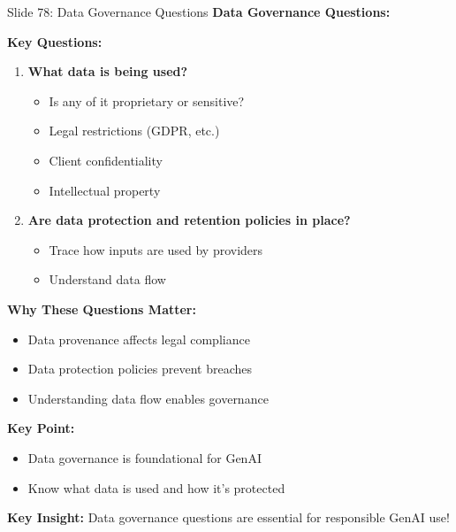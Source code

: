 \documentclass[8pt]{beamer}
\begin{document}
	\begin{frame}{Slide 78: Data Governance Questions}
		\fontsize{6.5}{7.5}\selectfont
		\textbf{Data Governance Questions:}
		
		\vspace{0.1cm}
		\textbf{Key Questions:}
		\begin{enumerate}
			\item \textbf{What data is being used?}
			\begin{itemize}
				\item Is any of it proprietary or sensitive?
				\item Legal restrictions (GDPR, etc.)
				\item Client confidentiality
				\item Intellectual property
			\end{itemize}
			\item \textbf{Are data protection and retention policies in place?}
			\begin{itemize}
				\item Trace how inputs are used by providers
				\item Understand data flow
			\end{itemize}
		\end{enumerate}
		
		\vspace{0.1cm}
		\textbf{Why These Questions Matter:}
		\begin{itemize}
			\item Data provenance affects legal compliance
			\item Data protection policies prevent breaches
			\item Understanding data flow enables governance
		\end{itemize}
		
		\vspace{0.1cm}
		\textbf{Key Point:}
		\begin{itemize}
			\item Data governance is foundational for GenAI
			\item Know what data is used and how it's protected
		\end{itemize}
		
		\textcolor{myblue}{\textbf{Key Insight:}} Data governance questions are \textcolor{myblue}{essential for responsible GenAI use}!
	\end{frame}
	
\end{document}
